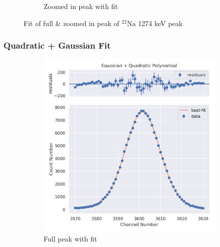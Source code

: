 \documentclass[11pt,a4paper]{article}
\newcommand{\element}[2]{$^{#2}\textrm{#1}$}
\begin{document}
\begin{figure}[H]
\begin{subfigure}{.5\linewidth}
    \caption{Zoomed in peak with fit}
  \end{subfigure}
  \caption{Fit of full \& zoomed in peak of \element{Na}{22} 1274 keV peak}
\end{figure}
\clearpage
\subsubsection{Quadratic + Gaussian Fit}
\begin{figure}[H]
  \centering
  \begin{subfigure}{.5\linewidth}
    \centering
    \includegraphics[width=\linewidth]{./Images/Sodium22/Quad/Quad_1_Full.png}
    \caption{Full peak with fit}
  \end{subfigure}%
  \begin{subfigure}{.5\linewidth}
    \centering

\end{subfigure}
\end{figure}
\end{document}

